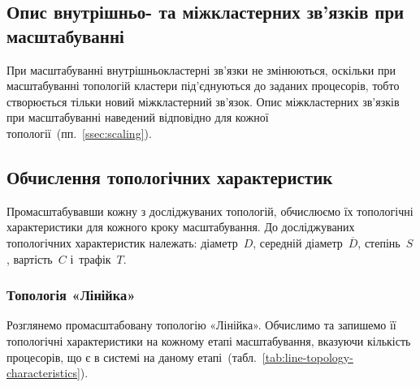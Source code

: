 \documentclass[
	a4paper,
	oneside,
	BCOR = 10mm,
	DIV = 12,
	12pt,
	headings = normal,
]{scrartcl}
\begin{document}
		\subsection{Опис внутрішньо- та міжкластерних зв'язків при масштабуванні}
			При масштабуванні внутрішньокластерні зв'язки не змінюються, оскільки при масштабуванні топологій кластери під'єднуються до заданих процесорів, тобто створюється тільки новий міжкластерний зв'язок. Опис міжкластерних зв'язків при масштабуванні наведений відповідно для кожної топології~(пп.~\ref{ssec:scaling}).

		\subsection{Обчислення топологічних характеристик}
			Промасштабувавши кожну з досліджуваних топологій, обчислюємо їх топологічні характеристики для кожного кроку масштабування. До досліджуваних топологічних характеристик належать: діаметр~$D$, середній діаметр~$\overline{D}$, степінь~$S$, вартість~$C$ і~трафік~$T$.

			\subsubsection{Топологія «Лінійка»}
				Розглянемо промасштабовану топологію «Лінійка». Обчислимо та запишемо її топологічні характеристики на кожному етапі масштабування, вказуючи кількість процесорів, що є в системі на даному етапі~(табл.~\ref{tab:line-topology-characteristics}).
\end{document}
